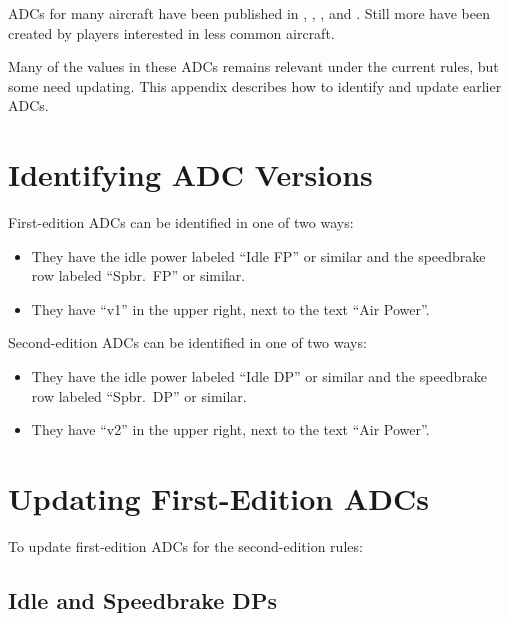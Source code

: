 

ADCs for many aircraft have been published in {\AirSup}, {\AirStr}, {\TSOH}, and {\APJ}. Still more have been created by players interested in less common aircraft. 

Many of the values in these ADCs remains relevant under the current rules, but some need updating. This appendix describes how to identify and update earlier ADCs.


\section{Identifying ADC Versions}

First-edition ADCs can be identified in one of two ways:
\begin{itemize} 
\item They have the idle power labeled “Idle FP” or similar and the speedbrake row labeled “Spbr.\ FP” or similar. 
\item They have “v1” in the upper right, next to the text “Air Power”.
\end{itemize}

Second-edition ADCs can be identified in one of two ways:
\begin{itemize} 
\item They have the idle power labeled “Idle DP” or similar and the speedbrake row labeled “Spbr.\ DP” or similar. 
\item They have “v2” in the upper right, next to the text “Air Power”.
\end{itemize}

\section{Updating First-Edition ADCs}

To update first-edition ADCs for the second-edition rules:

\subsection{Idle and Speedbrake DPs}


\begin{itemize}


\end{itemize}
